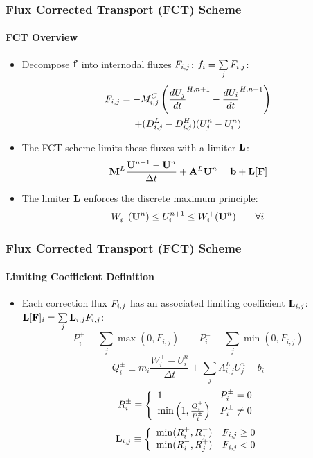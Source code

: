 \documentclass{beamer}
\begin{document}
\begin{frame}
\frametitle{Flux Corrected Transport (FCT) Scheme}
\framesubtitle{FCT Overview}

\begin{itemize}
   \item Decompose $\mathbf{f}$ into internodal fluxes $F_{i,j}$: $f_i = \sum\limits_j F_{i,j}$:
   \begin{multline}
      F_{i,j} = -M_{i,j}^C\left(\frac{dU_j}{dt}^{H,n+1} - \frac{dU_i}{dt}^{H,n+1}\right)\\
      + (D_{i,j}^L-D_{i,j}^H)(U^n_j - U^n_i)
   \end{multline}
   \item The FCT scheme limits these fluxes with a limiter $\mathbf{L}$:
   \begin{equation}
      \mathbf{M}^L\frac{\mathbf{U}^{n+1}-\mathbf{U}^n}{\Delta t} + \mathbf{A}^L\mathbf{U}^n = \mathbf{b} + \mathbf{L}[\mathbf{F}]
   \end{equation}
   \item The limiter $\mathbf{L}$ enforces the discrete maximum principle:
   \begin{equation}
         W_i^-(\mathbf{U}^n)\leq
         U_i^{n+1}\leq
         W_i^+(\mathbf{U}^n)\qquad\forall i
   \end{equation}
\end{itemize}

\end{frame}
\begin{frame}
\frametitle{Flux Corrected Transport (FCT) Scheme}
\framesubtitle{Limiting Coefficient Definition}

\begin{itemize}
   \item Each correction flux $F_{i,j}$ has an associated limiting
   coefficient $\mathbf{L}_{i,j}$: $\mathbf{L}[\mathbf{F}]_i = \sum\limits_j \mathbf{L}_{i,j} F_{i,j}$:
\begin{equation}\label{eq:P_defs}
   P_i^+ \equiv \sum\limits_j\max(0,F_{i,j}) \qquad
   P_i^- \equiv \sum\limits_j\min(0,F_{i,j})
\end{equation}
\begin{equation}\label{eq:Q_defs}
      Q_i^\pm \equiv m_i\frac{W_i^\pm-U_i^n}{\Delta t}
      + \sum\limits_j A_{i,j}^L U_j^n - b_i
\end{equation}
\begin{equation}\label{eq:R_defs}
   R_i^\pm \equiv\left\{
      \begin{array}{l l}
         1                                          & P_i^\pm = 0\\
         \min\left(1,\frac{Q_i^\pm}{P_i^\pm}\right) & P_i^\pm \ne 0
      \end{array}
      \right.
\end{equation}
\begin{equation}
   \mathbf{L}_{i,j} \equiv\left\{
      \begin{array}{l l}
         \min(R_i^+,R_j^-) & F_{i,j} \geq 0\\
         \min(R_i^-,R_j^+) & F_{i,j} < 0
      \end{array}
      \right.
\end{equation}
\end{itemize}

\end{frame}
\end{document}
